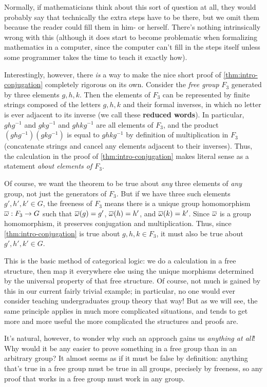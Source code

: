 Normally, if mathematicians think about this sort of question at all, they would probably say that technically the extra steps have to be there, but we omit them because the reader could fill them in him- or herself.
There's nothing intrinsically wrong with this (although it does start to become problematic when formalizing mathematics in a computer, since the computer can't fill in the steps itself unless some programmer takes the time to teach it exactly how).

Interestingly, however, there \emph{is} a way to make the nice short proof of \cref{thm:intro-conjugation} completely rigorous on its own.
Consider the \emph{free group} $F_3$ generated by three elements $g,h,k$.
Then the elements of $F_3$ can be represented by finite strings composed of the letters $g,h,k$ and their formal inverses, in which no letter is ever adjacent to its inverse (we call these \textbf{reduced words}).
In particular, $g h g^{-1}$ and $g k g^{-1}$ and $g h k g^{-1}$ are all elements of $F_3$, and the product $(g h g^{-1})(g k g^{-1})$ is equal to $g h k g^{-1}$ by definition of multiplication in $F_3$ (concatenate strings and cancel any elements adjacent to their inverses).
Thus, the calculation in the proof of \cref{thm:intro-conjugation} makes literal sense as a statement \emph{about elements of $F_3$}.

Of course, we want the theorem to be true about \emph{any} three elements of \emph{any} group, not just the generators of $F_3$.
But if we have three such elements $g', h', k'\in G$, the freeness of $F_3$ means there is a unique group homomorphism $\overline{\omega}:F_3 \to G$ such that $\overline{\omega}(g) = g'$, $\overline{\omega}(h)=h'$, and $\overline{\omega}(k)=k'$.
Since $\overline{\omega}$ is a group homomorphism, it preserves conjugation and multiplication.
Thus, since \cref{thm:intro-conjugation} is true about $g,h,k\in F_3$, it must also be true about $g',h',k'\in G$.

This is the basic method of categorical logic: we do a calculation in a free structure, then map it everywhere else using the unique morphisms determined by the universal property of that free structure.
Of course, not much is gained by this in our current fairly trivial example; in particular, no one would ever consider teaching undergraduates group theory that way!
But as we will see, the same principle applies in much more complicated situations, and tends to get more and more useful the more complicated the structures and proofs are.

It's natural, however, to wonder why such an approach gains us \emph{anything at all}!
Why would it be any easier to prove something in a free group than in an arbitrary group?
It almost seems as if it must be false by definition: anything that's true in a free group must be true in all groups, precisely by freeness, so any proof that works in a free group must work in any group.

